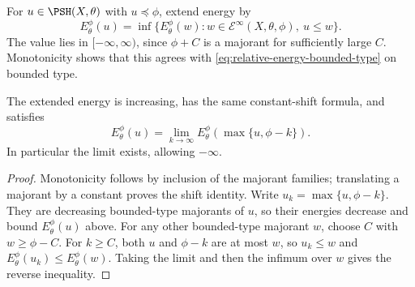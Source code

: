 \begin{definition}\label{def:extended-relative-energy}
For $u\in\PSH(X,\theta)$ with $u\preceq\phi$, extend energy by
\[
 E_\theta^\phi(u)=\inf\{E_\theta^\phi(w):w\in\mathcal E^\infty(X,\theta,\phi),\ u\leq w\}.
\]
The value lies in $[-\infty,\infty)$, since $\phi+C$ is a majorant for sufficiently large $C$. Monotonicity shows that this agrees with \eqref{eq:relative-energy-bounded-type} on bounded type.
\end{definition}

\begin{proposition}\label{prop:relative-energy-canonical-truncations}
The extended energy is increasing, has the same constant-shift formula, and satisfies
\[
 E_\theta^\phi(u)=\lim_{k\to\infty}
                       E_\theta^\phi(\max\{u,\phi-k\}).
\]
In particular the limit exists, allowing $-\infty$.
\end{proposition}
\begin{proof}
Monotonicity follows by inclusion of the majorant families; translating a majorant by a constant proves the shift identity. Write $u_k=\max\{u,\phi-k\}$. They are decreasing bounded-type majorants of $u$, so their energies decrease and bound $E_\theta^\phi(u)$ above. For any other bounded-type majorant $w$, choose $C$ with $w\geq\phi-C$. For $k\geq C$, both $u$ and $\phi-k$ are at most $w$, so $u_k\leq w$ and $E_\theta^\phi(u_k)\leq E_\theta^\phi(w)$. Taking the limit and then the infimum over $w$ gives the reverse inequality.
\end{proof}

